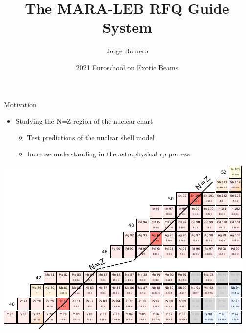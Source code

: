 \documentclass{beamer}
\title{The MARA-LEB RFQ Guide System}
\date{2021 Euroschool on Exotic Beams}
\author[auth]{Jorge Romero}
\institute[inst]{\vspace*{-1em}}
\begin{document}
\begin{frame}
\titlepage
\end{frame}

\begin{frame}{Motivation}
    \vspace*{4em}
    \begin{itemize}
        \item Studying the N=Z region of the nuclear chart 
        \begin{itemize}
            \item<2-> Test predictions of the nuclear shell model
            \item<3-> Increase understanding in the astrophysical rp process
        \end{itemize}
    \end{itemize}
    \vspace*{1em}
   
    \flushright
    \vspace*{-5em}
    \includegraphics[scale=0.9]{assets/chart.pdf}
\end{frame}
\end{document}
